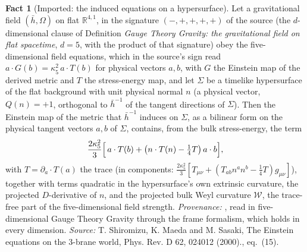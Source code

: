 \documentclass[11pt]{article}
\theoremstyle{definition}
\newtheorem{fact}[theorem]{Fact}
\theoremstyle{plain}
\newcommand{\changedmark}[2]{\marginpar{\raggedright\scriptsize\color{#1}#2}}
\providecommand{\R}{}\renewcommand{\R}{\mathbb{R}}
\providecommand{\hb}{}\renewcommand{\hb}{\bar{h}}
\begin{document}
\begin{fact}[Imported: the induced equations on a hypersurface]\label{c:dark-matter.imported-induced-equations-hypersurface}
\changedmark{BurntOrange}{changed since the deposit}
Let a gravitational field $(\hb, \Omega)$ on flat $\R^{4,1}$, in the signature $(-,+,+,+,+)$ of the source (the $d$-dimensional clause of Definition \emph{Gauge Theory Gravity: the gravitational field on flat spacetime}, $d = 5$, with the product of that signature) obey the five-dimensional field equations, which in the source's sign read $a \cdot G(b) = \kappa_{5}^{2}\, a \cdot T(b)$ for physical vectors $a, b$, with $G$ the Einstein map of the derived metric and $T$ the stress-energy map, and let $\Sigma$ be a timelike hypersurface of the flat background with unit physical normal $n$ (a physical vector, $Q(n) = +1$, orthogonal to $\hb^{-1}$ of the tangent directions of $\Sigma$). Then the Einstein map of the metric that $\hb^{-1}$ induces on $\Sigma$, as a bilinear form on the physical tangent vectors $a, b$ of $\Sigma$, contains, from the bulk stress-energy, the term
\[
\frac{2\kappa_{5}^{2}}{3}\Bigl[\,a \cdot T(b) + \bigl(n \cdot T(n) - \tfrac{1}{4}T\bigr)\, a \cdot b\Bigr],
\]
with $T = \partial_a \cdot T(a)$ the trace (in components: $\tfrac{2\kappa_{5}^{2}}{3}[T_{\mu\nu} + (T_{ab}n^{a}n^{b} - \tfrac14 T)g_{\mu\nu}]$), together with terms quadratic in the hypersurface's own extrinsic curvature, the projected $D$-derivative of $n$, and the projected bulk Weyl curvature $\mathcal{W}$, the trace-free part of the five-dimensional field strength. \emph{Provenance:} \cite[eq.~(15)]{SMS2000}, read in five-dimensional Gauge Theory Gravity through the frame formalism, which holds in every dimension.
\emph{Source:} T. Shiromizu, K. Maeda and M. Sasaki, The Einstein equations on the 3-brane world, Phys. Rev. D 62, 024012 (2000)., eq.~(15).
\end{fact}
\end{document}
